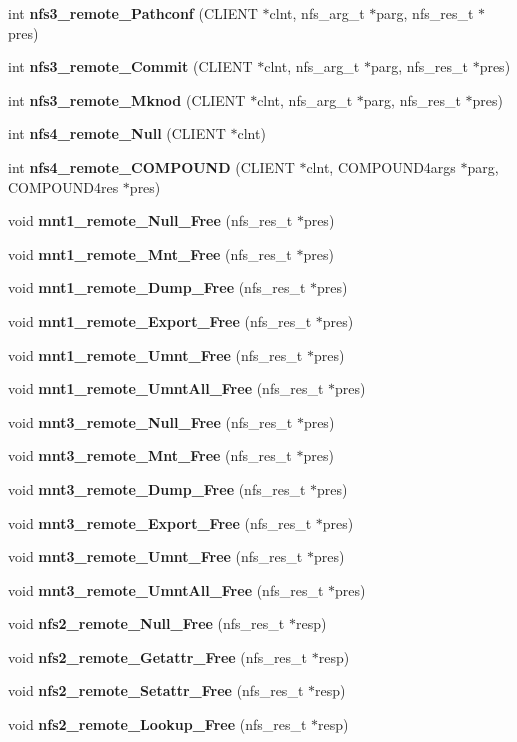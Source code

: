 \begin{CompactItemize}
\item 
int {\bf nfs3\_\-remote\_\-Pathconf} (CLIENT $\ast$clnt, nfs\_\-arg\_\-t $\ast$parg, nfs\_\-res\_\-t $\ast$pres)
\item 
int {\bf nfs3\_\-remote\_\-Commit} (CLIENT $\ast$clnt, nfs\_\-arg\_\-t $\ast$parg, nfs\_\-res\_\-t $\ast$pres)
\item 
int {\bf nfs3\_\-remote\_\-Mknod} (CLIENT $\ast$clnt, nfs\_\-arg\_\-t $\ast$parg, nfs\_\-res\_\-t $\ast$pres)
\item 
int {\bf nfs4\_\-remote\_\-Null} (CLIENT $\ast$clnt)
\item 
int {\bf nfs4\_\-remote\_\-COMPOUND} (CLIENT $\ast$clnt, COMPOUND4args $\ast$parg, COMPOUND4res $\ast$pres)
\item 
void {\bf mnt1\_\-remote\_\-Null\_\-Free} (nfs\_\-res\_\-t $\ast$pres)
\item 
void {\bf mnt1\_\-remote\_\-Mnt\_\-Free} (nfs\_\-res\_\-t $\ast$pres)
\item 
void {\bf mnt1\_\-remote\_\-Dump\_\-Free} (nfs\_\-res\_\-t $\ast$pres)
\item 
void {\bf mnt1\_\-remote\_\-Export\_\-Free} (nfs\_\-res\_\-t $\ast$pres)
\item 
void {\bf mnt1\_\-remote\_\-Umnt\_\-Free} (nfs\_\-res\_\-t $\ast$pres)
\item 
void {\bf mnt1\_\-remote\_\-Umnt\-All\_\-Free} (nfs\_\-res\_\-t $\ast$pres)
\item 
void {\bf mnt3\_\-remote\_\-Null\_\-Free} (nfs\_\-res\_\-t $\ast$pres)
\item 
void {\bf mnt3\_\-remote\_\-Mnt\_\-Free} (nfs\_\-res\_\-t $\ast$pres)
\item 
void {\bf mnt3\_\-remote\_\-Dump\_\-Free} (nfs\_\-res\_\-t $\ast$pres)
\item 
void {\bf mnt3\_\-remote\_\-Export\_\-Free} (nfs\_\-res\_\-t $\ast$pres)
\item 
void {\bf mnt3\_\-remote\_\-Umnt\_\-Free} (nfs\_\-res\_\-t $\ast$pres)
\item 
void {\bf mnt3\_\-remote\_\-Umnt\-All\_\-Free} (nfs\_\-res\_\-t $\ast$pres)
\item 
void {\bf nfs2\_\-remote\_\-Null\_\-Free} (nfs\_\-res\_\-t $\ast$resp)
\item 
void {\bf nfs2\_\-remote\_\-Getattr\_\-Free} (nfs\_\-res\_\-t $\ast$resp)
\item 
void {\bf nfs2\_\-remote\_\-Setattr\_\-Free} (nfs\_\-res\_\-t $\ast$resp)
\item 
void {\bf nfs2\_\-remote\_\-Lookup\_\-Free} (nfs\_\-res\_\-t $\ast$resp)

\end{CompactItemize}
